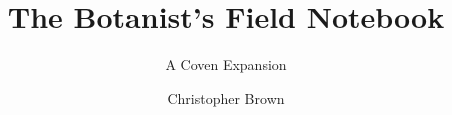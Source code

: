 \documentclass[a4paper,10pt,twocolumn]{memoir}
\title{The Botanist's Field Notebook}
\subtitle{A Coven Expansion}
\author{Christopher Brown}
\begin{document}
\frontmatter

\titlepage



\tableofcontents*

\mainmatter



\backmatter

\printindex
\end{document}
